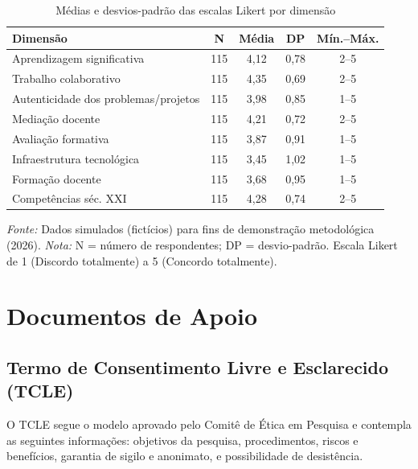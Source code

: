 \documentclass[12pt,a4paper,twoside,openright]{book}
\begin{document}
\begin{table}[htbp]
    \centering
    \caption{Médias e desvios-padrão das escalas Likert por dimensão}
    \label{tab:medias_likert}
    \small
    \begin{tabular}{lcccc}
        \toprule
        \textbf{Dimensão} & \textbf{N} & \textbf{Média} & \textbf{DP} & \textbf{Mín.--Máx.} \\
        \midrule
        Aprendizagem significativa & 115 & 4,12 & 0,78 & 2--5 \\
        Trabalho colaborativo & 115 & 4,35 & 0,69 & 2--5 \\
        Autenticidade dos problemas/projetos & 115 & 3,98 & 0,85 & 1--5 \\
        Mediação docente & 115 & 4,21 & 0,72 & 2--5 \\
        Avaliação formativa & 115 & 3,87 & 0,91 & 1--5 \\
        Infraestrutura tecnológica & 115 & 3,45 & 1,02 & 1--5 \\
        Formação docente & 115 & 3,68 & 0,95 & 1--5 \\
        Competências séc. XXI & 115 & 4,28 & 0,74 & 2--5 \\
        \bottomrule
    \end{tabular}
    \par\medskip
    \footnotesize{\textit{Fonte:} Dados simulados (fictícios) para fins de demonstração metodológica (2026). \textit{Nota:} N = número de respondentes; DP = desvio-padrão. Escala Likert de 1 (Discordo totalmente) a 5 (Concordo totalmente).}
\end{table}



\chapter{Documentos de Apoio}
\label{anx:documentos}

\section{Termo de Consentimento Livre e Esclarecido (TCLE)}
\label{sec:tcle}

O TCLE segue o modelo aprovado pelo Comitê de Ética em Pesquisa e contempla as seguintes informações: objetivos da pesquisa, procedimentos, riscos e benefícios, garantia de sigilo e anonimato, e possibilidade de desistência.
\end{document}
